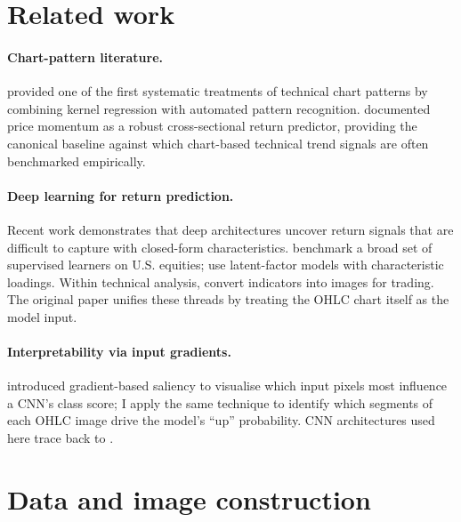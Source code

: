 \documentclass{article}
\begin{document}
\section{Related work}
\label{sec:related}

\paragraph{Chart-pattern literature.}
\citet{lo2000foundations} provided one of the first systematic treatments
of technical chart patterns by combining kernel regression with automated
pattern recognition. \citet{jegadeesh1993returns} documented price momentum
as a robust cross-sectional return predictor, providing the canonical
baseline against which chart-based technical trend signals are often
benchmarked empirically.

\paragraph{Deep learning for return prediction.}
Recent work demonstrates that deep architectures uncover return signals
that are difficult to capture with closed-form characteristics. \citet{gu2020empirical}
benchmark a broad set of supervised learners on U.S. equities;
\citet{kelly2019characteristics} use latent-factor models with characteristic
loadings. Within technical analysis, \citet{sezer2018algorithmic} convert
indicators into images for trading. The original paper unifies these
threads by treating the OHLC chart itself as the model input.

\paragraph{Interpretability via input gradients.}
\citet{simonyan2014deep} introduced gradient-based saliency to visualise
which input pixels most influence a CNN's class score; I apply the same
technique to identify which segments of each OHLC image drive the model's
``up'' probability. CNN architectures used here trace back to
\citet{lecun1998gradient}.


\section{Data and image construction}
\label{sec:data}
\end{document}

